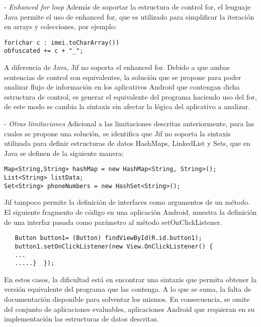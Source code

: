 - \textit{Enhanced for loop} \newline
Además de soportar la estructura de control for, el lenguaje Java permite el uso
de enhanced for, que es utilizado para simplificar la iteración en arrays y
colecciones, por ejemplo:
\begin{lstlisting}
for(char c : imei.toCharArray())
obfuscated += c + "_";
\end{lstlisting}
A diferencia de Java, Jif no soporta el enhanced for.\newline
Debido a que ambas sentencias de control son equivalentes, la solución que se
propone para poder analizar flujo de información en los aplicativos Android que
contengan dicha estructura de control, es generar el equivalente del programa
haciendo uso del for, de este modo se cambia la sintaxis sin afectar la lógica
del aplicativo a analizar.

- \textit{Otras limitaciones} \newline
Adicional a las limitaciones descritas anteriormente, para las cuales se propone
una solución, se identifica que Jif no soporta la sintaxis utilizada para
definir estructuras de datos HashMaps, LinkedList y Sets, que en Java se definen
de la siguiente manera:
\begin{lstlisting}
Map<String,String> hashMap = new HashMap<String, String>();
List<String> listData;
Set<String> phoneNumbers = new HashSet<String>();
\end{lstlisting}
Jif tampoco permite la definición de interfaces como argumentos de un método. El
siguiente fragmento de código  en una aplicación Android, muestra la definición
de una interfaz pasada como parámetro al método setOnClickListener.
\begin{lstlisting}
   Button button1= (Button) findViewById(R.id.button1);
   button1.setOnClickListener(new View.OnClickListener() {
   ...
   .....}  });
\end{lstlisting}
En estos casos, la dificultad está en encontrar una sintaxis que permita obtener
la versión equivalente del programa que las contenga. A lo que se suma, la falta
de documentación disponible para solventar los mismos. En consecuencia, se omite
del conjunto de aplicaciones evaluables, aplicaciones Android que requieran en
su implementación las estructuras de datos descritas.\newline

